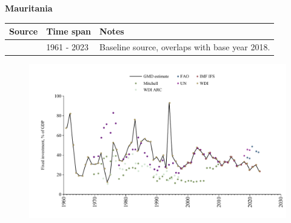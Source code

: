 \documentclass[12pt,a4paper,landscape]{article}
\begin{document}
\begin{adjustbox}{max totalsize={\paperwidth}{\paperheight},center}
\begin{minipage}[t][\textheight][t]{\textwidth}
\vspace*{0.5cm}
{}
\begin{center}
{\Large\bfseries Mauritania}
\end{center}
\vspace{0.5cm}
\begin{table}[H]
\centering
\small
\begin{tabular}{|l|l|l|}
\hline
\textbf{Source} & \textbf{Time span} & \textbf{Notes} \\
\hline
\rowcolor{white}\cite{WDI}& 1961 - 2023 &Baseline source, overlaps with base year 2018.\\
\hline
\end{tabular}
\end{table}
\begin{figure}[H]
\centering
\includegraphics[width=\textwidth,height=0.6\textheight,keepaspectratio]{graphs/MRT_finv_GDP.pdf}
\end{figure}
\end{minipage}
\end{adjustbox}
\end{document}
